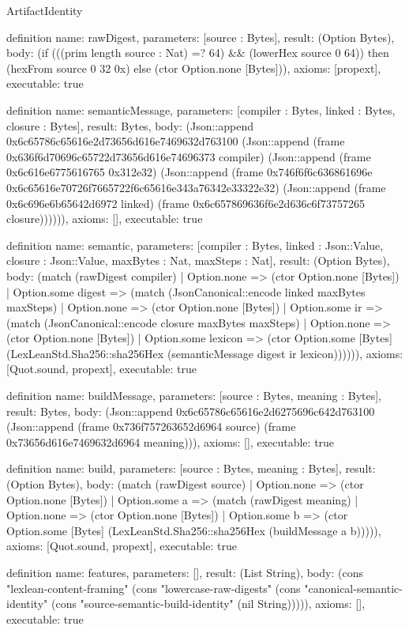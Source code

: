 \begin{lexlean}{ArtifactIdentity}
\begin{semanticmodule}
definition{
 name: rawDigest,
 parameters: [source : Bytes],
 result: (Option Bytes),
 body: (if (((prim length source : Nat) =? 64) && (lowerHex source 0 64)) then (hexFrom source 0 32 0x) else (ctor Option.none [Bytes])),
 axioms: [propext],
 executable: true
}

definition{
 name: semanticMessage,
 parameters: [compiler : Bytes, linked : Bytes, closure : Bytes],
 result: Bytes,
 body: (Json::append 0x6c65786c65616e2d73656d616e7469632d763100 (Json::append (frame 0x636f6d70696c65722d73656d616e74696373 compiler) (Json::append (frame 0x6c616e6775616765 0x312e32) (Json::append (frame 0x746f6f6c636861696e 0x6c65616e70726f7665722f6c65616e343a76342e33322e32) (Json::append (frame 0x6c696e6b65642d6972 linked) (frame 0x6c657869636f6e2d636c6f73757265 closure)))))),
 axioms: [],
 executable: true
}

definition{
 name: semantic,
 parameters: [compiler : Bytes, linked : Json::Value, closure : Json::Value, maxBytes : Nat, maxSteps : Nat],
 result: (Option Bytes),
 body: (match (rawDigest compiler) | Option.none => (ctor Option.none [Bytes]) | Option.some digest => (match (JsonCanonical::encode linked maxBytes maxSteps) | Option.none => (ctor Option.none [Bytes]) | Option.some ir => (match (JsonCanonical::encode closure maxBytes maxSteps) | Option.none => (ctor Option.none [Bytes]) | Option.some lexicon => (ctor Option.some [Bytes] (LexLeanStd.Sha256::sha256Hex (semanticMessage digest ir lexicon)))))),
 axioms: [Quot.sound, propext],
 executable: true
}

definition{
 name: buildMessage,
 parameters: [source : Bytes, meaning : Bytes],
 result: Bytes,
 body: (Json::append 0x6c65786c65616e2d6275696c642d763100 (Json::append (frame 0x736f757263652d6964 source) (frame 0x73656d616e7469632d6964 meaning))),
 axioms: [],
 executable: true
}

definition{
 name: build,
 parameters: [source : Bytes, meaning : Bytes],
 result: (Option Bytes),
 body: (match (rawDigest source) | Option.none => (ctor Option.none [Bytes]) | Option.some a => (match (rawDigest meaning) | Option.none => (ctor Option.none [Bytes]) | Option.some b => (ctor Option.some [Bytes] (LexLeanStd.Sha256::sha256Hex (buildMessage a b))))),
 axioms: [Quot.sound, propext],
 executable: true
}

definition{
 name: features,
 parameters: [],
 result: (List String),
 body: (cons "lexlean-content-framing" (cons "lowercase-raw-digests" (cons "canonical-semantic-identity" (cons "source-semantic-build-identity" (nil String))))),
 axioms: [],
 executable: true
}
\end{semanticmodule}
\end{lexlean}
